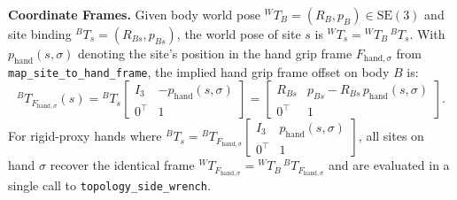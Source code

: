 \documentclass[11pt,a4paper]{article}
\begin{document}
\textbf{Coordinate Frames.} Given body world pose ${}^{W}T_{B} = (R_{B}, p_{B}) \in \mathrm{SE}(3)$ and site binding
${}^{B}T_{s} = (R_{Bs}, p_{Bs})$, the world pose of site $s$ is ${}^{W}T_{s} = {}^{W}T_{B}\,{}^{B}T_{s}$.
With $p_{\mathrm{hand}}(s,\sigma)$ denoting the site's position in the hand grip frame $F_{\mathrm{hand},\sigma}$ from
\texttt{map\_site\_to\_hand\_frame}, the implied hand grip frame offset on body $B$ is:
\begin{equation}
{}^{B}T_{F_{\mathrm{hand},\sigma}}(s) = {}^{B}T_{s} \begin{bmatrix} I_3 & -p_{\mathrm{hand}}(s,\sigma) \\ 0^{\top} & 1 \end{bmatrix}
= \begin{bmatrix} R_{Bs} & p_{Bs} - R_{Bs}\,p_{\mathrm{hand}}(s,\sigma) \\ 0^{\top} & 1 \end{bmatrix}.
\end{equation}
For rigid-proxy hands where ${}^{B}T_{s} = {}^{B}T_{F_{\mathrm{hand},\sigma}} \begin{bmatrix} I_3 & p_{\mathrm{hand}}(s,\sigma) \\ 0^{\top} & 1 \end{bmatrix}$,
all sites on hand $\sigma$ recover the identical frame ${}^{W}T_{F_{\mathrm{hand},\sigma}} = {}^{W}T_{B}\,{}^{B}T_{F_{\mathrm{hand},\sigma}}$
and are evaluated in a single call to \texttt{topology\_side\_wrench}.
\end{document}
